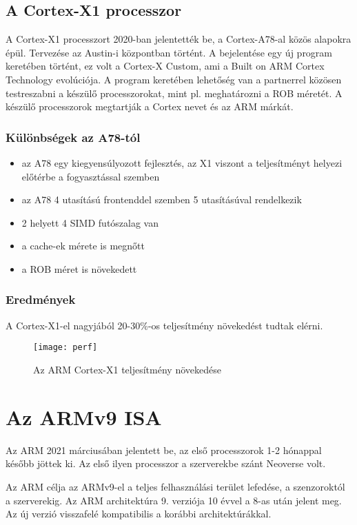 \subsection{A Cortex-X1 processzor}
A Cortex-X1 processzort 2020-ban jelentették be, a Cortex-A78-al közös alapokra épül.
Tervezése az Austin-i központban történt.
A bejelentése egy új program keretében történt, ez volt a Cortex-X Custom, ami a Built on ARM Cortex Technology evolúciója.
A program keretében lehetőség van a partnerrel közösen testreszabni a készülő processzorokat, mint pl. meghatározni a ROB méretét.
A készülő processzorok megtartják a Cortex nevet és az ARM márkát.

\subsubsection{Különbségek az A78-tól}
\begin{itemize}
    \item az A78 egy kiegyensúlyozott fejlesztés, az X1 viszont a teljesítményt helyezi előtérbe a fogyasztással szemben
    \item az A78 4 utasítású frontenddel szemben 5 utasításúval rendelkezik
    \item 2 helyett 4 SIMD futószalag van
    \item a cache-ek mérete is megnőtt
    \item a ROB méret is növekedett
\end{itemize}

\subsubsection{Eredmények}
A Cortex-X1-el nagyjából 20-30\%-os teljesítmény növekedést tudtak elérni.
\begin{figure}[H]
    \texttt{[image: perf]}
    \centering
    \caption{Az ARM Cortex-X1 teljesítmény növekedése}
    \label{fig:perf}
\end{figure}

\section{Az ARMv9 ISA}
Az ARM 2021 márciusában jelentett be, az első processzorok 1-2 hónappal később jöttek ki.
Az első ilyen processzor a szerverekbe szánt Neoverse volt.

Az ARM célja az ARMv9-el a teljes felhasználási terület lefedése, a szenzoroktól a szerverekig.
Az ARM architektúra 9. verziója 10 évvel a 8-as után jelent meg.
Az új verzió visszafelé kompatibilis a korábbi architektúrákkal.

